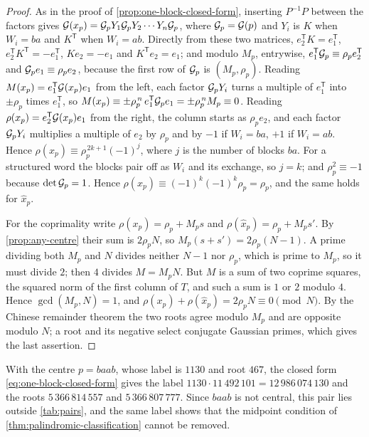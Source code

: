 \begin{proof}
As in the proof of \cref{prop:one-block-closed-form}, inserting $P^{-1}P$ between the factors
gives $\mathcal{G}(x_p)=\mathcal{G}_pY_1\mathcal{G}_pY_2\cdots Y_n\mathcal{G}_p$, where $\mathcal{G}_p=\mathcal{G}(p)$ and $Y_i$ is
$K$ when $W_i=ba$ and $K^{\mathsf T}$ when $W_i=ab$. Directly from these two matrices,
$e_2^{\mathsf T}K=e_1^{\mathsf T}$, $e_2^{\mathsf T}K^{\mathsf T}=-e_1^{\mathsf T}$,
$Ke_2=-e_1$ and $K^{\mathsf T}e_2=e_1$; and modulo $M_p$, entrywise,
$e_1^{\mathsf T}\mathcal{G}_p\equiv\rho_pe_2^{\mathsf T}$ and $\mathcal{G}_pe_1\equiv\rho_pe_2$, because the
first row of $\mathcal{G}_p$ is $(M_p,\rho_p)$. Reading $M(x_p)=e_1^{\mathsf T}\mathcal{G}(x_p)e_1$ from the
left, each factor $\mathcal{G}_pY_i$ turns a multiple of $e_1^{\mathsf T}$ into $\pm\rho_p$ times
$e_1^{\mathsf T}$, so $M(x_p)\equiv\pm\rho_p^{\,n}\,e_1^{\mathsf T}\mathcal{G}_pe_1=\pm\rho_p^{\,n}M_p\equiv0$.
Reading $\rho(x_p)=e_2^{\mathsf T}\mathcal{G}(x_p)e_1$ from the right, the column starts as
$\rho_pe_2$, and each factor $\mathcal{G}_pY_i$ multiplies a multiple of $e_2$ by $\rho_p$ and by
$-1$ if $W_i=ba$, $+1$ if $W_i=ab$. Hence
$\rho(x_p)\equiv\rho_p^{\,2k+1}(-1)^{j}$, where $j$ is the number of blocks $ba$. For a
structured word the blocks pair off as $W_i$ and its exchange, so $j=k$; and
$\rho_p^2\equiv-1$ because $\det\mathcal{G}_p=1$. Hence $\rho(x_p)\equiv(-1)^k(-1)^k\rho_p=\rho_p$,
and the same holds for $\widehat x_p$.

For the coprimality write $\rho(x_p)=\rho_p+M_ps$ and $\rho(\widehat x_p)=\rho_p+M_ps'$. By
\cref{prop:any-centre} their sum is $2\rho_pN$, so $M_p(s+s')=2\rho_p(N-1)$. A prime dividing
both $M_p$ and $N$ divides neither $N-1$ nor $\rho_p$, which is prime to $M_p$, so it must
divide $2$; then $4$ divides $M=M_pN$. But $M$ is a sum of two coprime squares, the squared
norm of the first column of $T$, and such a sum is $1$ or $2$ modulo $4$. Hence
$\gcd(M_p,N)=1$, and $\rho(x_p)+\rho(\widehat x_p)=2\rho_pN\equiv0\pmod N$. By the Chinese
remainder theorem the two roots agree modulo $M_p$ and are opposite modulo $N$; a root and
its negative select conjugate Gaussian primes, which gives the last assertion.
\end{proof}

With the centre $p=baab$, whose label is $1130$ and root $467$, the closed form
\eqref{eq:one-block-closed-form} gives the label $1130\cdot11\,492\,101=12\,986\,074\,130$ and
the roots $5\,366\,814\,557$ and $5\,366\,807\,777$. Since $baab$ is not central, this pair lies
outside \cref{tab:pairs}, and the same label shows that the midpoint condition of
\cref{thm:palindromic-classification} cannot be removed.

